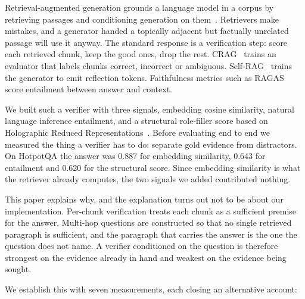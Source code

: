\documentclass[conference]{IEEEtran}
\begin{document}
Retrieval-augmented generation grounds a language model in a corpus by
retrieving passages and conditioning generation on them~\cite{lewis2020retrieval,
gao2023survey}. Retrievers make mistakes, and a generator handed a topically
adjacent but factually unrelated passage will use it anyway. The standard
response is a verification step: score each retrieved chunk, keep the good ones,
drop the rest. CRAG~\cite{yan2024corrective} trains an evaluator that labels
chunks correct, incorrect or ambiguous. Self-RAG~\cite{asai2023self} trains the
generator to emit reflection tokens. Faithfulness metrics such as
RAGAS~\cite{es2024ragas} score entailment between answer and context.

We built such a verifier with three signals, embedding cosine similarity,
natural language inference entailment, and a structural role-filler score based
on Holographic Reduced Representations~\cite{plate1995holographic}. Before
evaluating end to end we measured the thing a verifier has to do: separate gold
evidence from distractors. On HotpotQA the answer was 0.887 for embedding
similarity, 0.643 for entailment and 0.620 for the structural score. Since
embedding similarity is what the retriever already computes, the two signals we
added contributed nothing.

This paper explains why, and the explanation turns out not to be about our
implementation. Per-chunk verification treats each chunk as a sufficient premise
for the answer. Multi-hop questions are constructed so that no single retrieved
paragraph is sufficient, and the paragraph that carries the answer is the one
the question does not name. A verifier conditioned on the question is therefore
strongest on the evidence already in hand and weakest on the evidence being
sought.

\vspace{2pt}
We establish this with seven measurements, each closing an alternative account:
\end{document}
